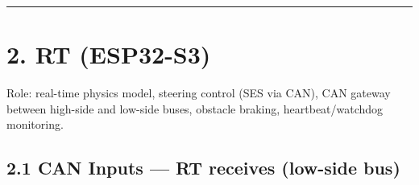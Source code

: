 \documentclass[12pt,a4paper,oneside]{report}
\begin{document}
\begin{center}\rule{0.5\linewidth}{0.5pt}\end{center}

\section{2. RT (ESP32-S3)}\label{rt-esp32-s3}

Role: real-time physics model, steering control (SES via CAN), CAN gateway
between high-side and low-side buses, obstacle braking, heartbeat/watchdog
monitoring.

\subsection{2.1 CAN Inputs --- RT receives (low-side
bus)}\label{can-inputs-rt-receives-low-side-bus}
\end{document}

